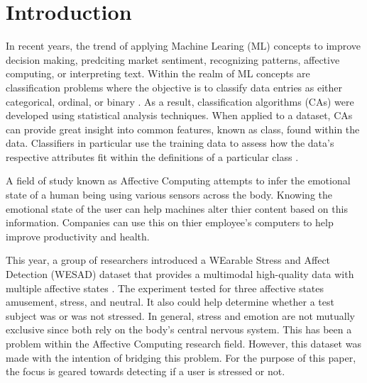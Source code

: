 \section{Introduction}
\label{sec:intro}

In recent years, the trend of applying Machine Learing (ML) concepts to improve decision making, predciting 
market sentiment, recognizing patterns, affective computing, or interpreting text. 
Within the realm of ML concepts are classification problems where the objective is to classify data entries 
as either categorical, ordinal, or binary \cite[p. 327-328]{textbook}. 
As a result, classification algorithms (CAs) were developed using statistical analysis techniques. 
When applied to a dataset, CAs can provide great insight into common features, known as class,
found within the data. Classifiers in particular use the training data to assess how the data's respective 
attributes fit within the definitions of a particular class \cite{class}. 

A field of study known as Affective Computing attempts to infer the emotional state of a human being using 
various sensors across the body. Knowing the emotional state of the user can help machines alter thier 
content based on this information. Companies can use this on thier employee's computers to help improve 
productivity and health. 

This year, a group of researchers introduced a WEarable Stress and Affect Detection (WESAD) dataset that 
provides a multimodal high-quality data with multiple affective states \cite{WESAD}. The experiment 
tested for three affective states amusement, stress, and neutral. It also could help determine whether a test 
subject was or was not stressed. In general, stress and emotion are not mutually exclusive since both 
rely on the body's central nervous system. This has been a problem within the Affective Computing 
research field. However, this dataset was made with the intention of bridging this problem. 
For the purpose of this paper, the focus is geared towards detecting if a user is stressed or not.  
